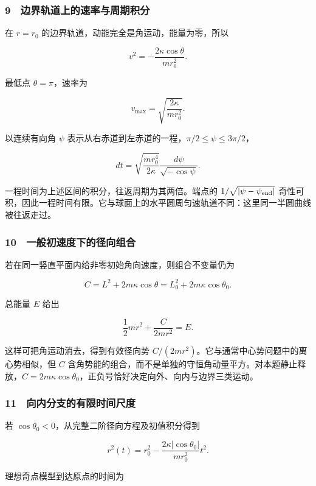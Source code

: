 \documentclass[12pt,a4paper,fontset=fandol]{ctexart}
\begin{document}
\subsubsection{9　边界轨道上的速率与周期积分}\label{ux8fb9ux754cux8f68ux9053ux4e0aux7684ux901fux7387ux4e0eux5468ux671fux79efux5206}

在 \(r=r_0\) 的边界轨道，动能完全是角运动，能量为零，所以

\[v^2=-\frac{2\kappa\cos\theta}{mr_0^2}.\]

最低点 \(\theta=\pi\)，速率为

\[v_{\max}=\sqrt{\frac{2\kappa}{mr_0^2}}.\]

以连续有向角 \(\psi\)
表示从右赤道到左赤道的一程，\(\pi/2\le\psi\le3\pi/2\)，

\[dt=\sqrt{\frac{mr_0^4}{2\kappa}}
\frac{d\psi}{\sqrt{-\cos\psi}}.\]

一程时间为上述区间的积分，往返周期为其两倍。端点的
\(1/\sqrt{|\psi-\psi_{\rm end}|}\)
奇性可积，因此一程时间有限。它与球面上的水平圆周匀速轨道不同：这里同一半圆曲线被往返走过。

\subsubsection{10　一般初速度下的径向组合}\label{ux4e00ux822cux521dux901fux5ea6ux4e0bux7684ux5f84ux5411ux7ec4ux5408}

若在同一竖直平面内给非零初始角向速度，则组合不变量仍为

\[C=L^2+2m\kappa\cos\theta
=L_0^2+2m\kappa\cos\theta_0.\]

总能量 \(E\) 给出

\[\frac12m\dot r^2+\frac{C}{2mr^2}=E.\]

这样可把角运动消去，得到有效径向势
\(C/(2mr^2)\)。它与通常中心势问题中的离心势相似，但 \(C\)
含角势能的组合，而不是单独的守恒角动量平方。对本题静止释放，\(C=2m\kappa\cos\theta_0\)，正负号恰好决定向外、向内与边界三类运动。

\subsubsection{11　向内分支的有限时间尺度}\label{ux5411ux5185ux5206ux652fux7684ux6709ux9650ux65f6ux95f4ux5c3aux5ea6}

若 \(\cos\theta_0<0\)，从完整二阶径向方程及初值积分得到

\[r^2(t)=r_0^2-
\frac{2\kappa|\cos\theta_0|}{mr_0^2}t^2.\]

理想奇点模型到达原点的时间为
\end{document}
